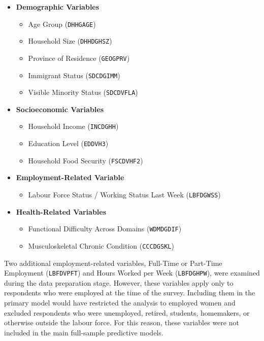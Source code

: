 \documentclass[12pt]{article}
\begin{document}
\begin{itemize}

\item \textbf{Demographic Variables}
\begin{itemize}
\item Age Group (\texttt{DHHGAGE})
\item Household Size (\texttt{DHHDGHSZ})
\item Province of Residence (\texttt{GEOGPRV})
\item Immigrant Status (\texttt{SDCDGIMM})
\item Visible Minority Status (\texttt{SDCDVFLA})
\end{itemize}

\item \textbf{Socioeconomic Variables}
\begin{itemize}
\item Household Income (\texttt{INCDGHH})
\item Education Level (\texttt{EDDVH3})
\item Household Food Security (\texttt{FSCDVHF2})
\end{itemize}

\item \textbf{Employment-Related Variable}
\begin{itemize}
\item Labour Force Status / Working Status Last Week (\texttt{LBFDGWSS})
\end{itemize}

\item \textbf{Health-Related Variables}
\begin{itemize}
\item Functional Difficulty Across Domains (\texttt{WDMDGDIF})
\item Musculoskeletal Chronic Condition (\texttt{CCCDGSKL})
\end{itemize}

\end{itemize}

Two additional employment-related variables, Full-Time or Part-Time Employment (\texttt{LBFDVPFT}) and Hours Worked per Week (\texttt{LBFDGHPW}), were examined during the data preparation stage. However, these variables apply only to respondents who were employed at the time of the survey. Including them in the primary model would have restricted the analysis to employed women and excluded respondents who were unemployed, retired, students, homemakers, or otherwise outside the labour force. For this reason, these variables were not included in the main full-sample predictive models.
\end{document}
